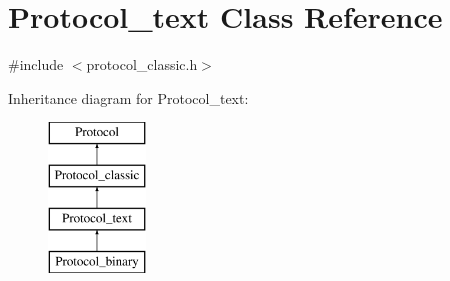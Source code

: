 \hypertarget{classProtocol__text}{}\section{Protocol\+\_\+text Class Reference}
\label{classProtocol__text}


{\ttfamily \#include $<$protocol\+\_\+classic.\+h$>$}

Inheritance diagram for Protocol\+\_\+text\+:\begin{figure}[H]
\begin{center}
\leavevmode
\includegraphics[height=4.000000cm]{classProtocol__text}
\end{center}
\end{figure}
